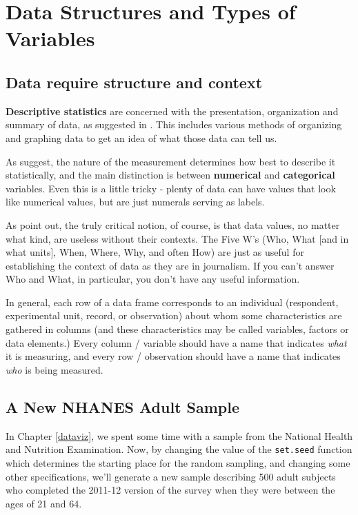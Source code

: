 \documentclass[
]{book}
\begin{document}
\hypertarget{data-structures-and-types-of-variables}{%
\chapter{Data Structures and Types of Variables}\label{data-structures-and-types-of-variables}}

\hypertarget{data-require-structure-and-context}{%
\section{Data require structure and context}\label{data-require-structure-and-context}}

\textbf{Descriptive statistics} are concerned with the presentation, organization and summary of data, as suggested in \citet{Norman-Streiner}. This includes various methods of organizing and graphing data to get an idea of what those data can tell us.

As \citet{Vittinghoff} suggest, the nature of the measurement determines how best to describe it statistically, and the main distinction is between \textbf{numerical} and \textbf{categorical} variables. Even this is a little tricky - plenty of data can have values that look like numerical values, but are just numerals serving as labels.

As \citet{BockVD} point out, the truly critical notion, of course, is that data values, no matter what kind, are useless without their contexts. The Five W's (Who, What {[}and in what units{]}, When, Where, Why, and often How) are just as useful for establishing the context of data as they are in journalism. If you can't answer Who and What, in particular, you don't have any useful information.

In general, each row of a data frame corresponds to an individual (respondent, experimental unit, record, or observation) about whom some characteristics are gathered in columns (and these characteristics may be called variables, factors or data elements.) Every column / variable should have a name that indicates \emph{what} it is measuring, and every row / observation should have a name that indicates \emph{who} is being measured.

\hypertarget{newNHANES}{%
\section{A New NHANES Adult Sample}\label{newNHANES}}

In Chapter \ref{dataviz}, we spent some time with a sample from the National Health and Nutrition Examination. Now, by changing the value of the \texttt{set.seed} function which determines the starting place for the random sampling, and changing some other specifications, we'll generate a new sample describing 500 adult subjects who completed the 2011-12 version of the survey when they were between the ages of 21 and 64.
\end{document}
